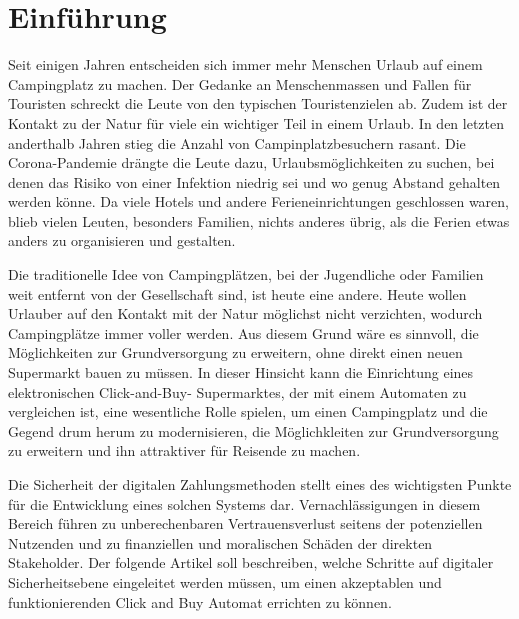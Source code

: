 \section{Einführung}


Seit einigen Jahren entscheiden sich immer mehr Menschen Urlaub auf einem Campingplatz 
zu machen. Der Gedanke an Menschenmassen und Fallen für Touristen schreckt die Leute von
den typischen Touristenzielen ab. Zudem ist der Kontakt zu der Natur für viele ein wichtiger
Teil in einem Urlaub. In den letzten anderthalb Jahren stieg die Anzahl von Campinplatzbesuchern
rasant. Die Corona-Pandemie drängte die Leute dazu, Urlaubsmöglichkeiten zu suchen, bei denen
das Risiko von einer Infektion niedrig sei und wo genug Abstand gehalten werden könne. Da viele 
Hotels und andere Ferieneinrichtungen geschlossen waren, blieb vielen Leuten, besonders Familien,
nichts anderes übrig, als die Ferien etwas anders zu organisieren und gestalten.

Die traditionelle Idee von Campingplätzen, bei der Jugendliche oder Familien weit entfernt von der 
Gesellschaft sind, ist heute eine andere. Heute wollen Urlauber auf den Kontakt mit der Natur
möglichst nicht verzichten, wodurch Campingplätze immer voller werden. Aus diesem Grund wäre es
sinnvoll, die Möglichkeiten zur Grundversorgung zu erweitern, ohne direkt einen neuen Supermarkt
bauen zu müssen. In dieser Hinsicht kann die Einrichtung eines elektronischen Click-and-Buy-
Supermarktes, der mit einem Automaten zu vergleichen ist, eine wesentliche Rolle spielen, um 
einen Campingplatz und die Gegend drum herum zu modernisieren, die Möglichkleiten zur Grundversorgung 
zu erweitern und ihn attraktiver für Reisende zu machen.

Die Sicherheit der digitalen Zahlungsmethoden stellt eines des wichtigsten Punkte für die Entwicklung
eines solchen Systems dar. Vernachlässigungen in diesem Bereich führen zu unberechenbaren Vertrauensverlust 
seitens der potenziellen Nutzenden und zu finanziellen und moralischen Schäden der direkten
Stakeholder. Der folgende Artikel soll beschreiben, welche Schritte auf digitaler Sicherheitsebene 
eingeleitet werden müssen, um einen akzeptablen und funktionierenden Click and Buy Automat errichten 
zu können. 